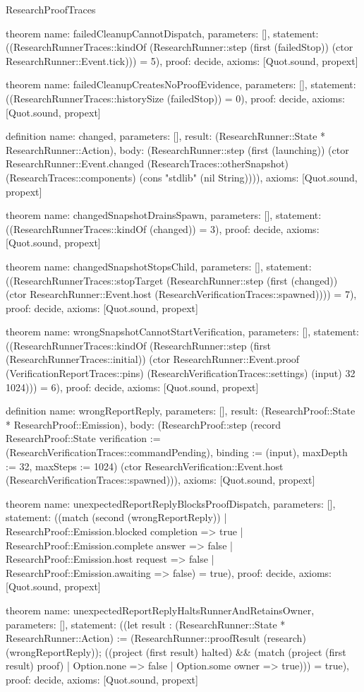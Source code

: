 \begin{lexlean}{ResearchProofTraces}
\begin{semanticmodule}
theorem{
 name: failedCleanupCannotDispatch,
 parameters: [],
 statement: ((ResearchRunnerTraces::kindOf (ResearchRunner::step (first (failedStop)) (ctor ResearchRunner::Event.tick))) = 5),
 proof: decide{},
 axioms: [Quot.sound, propext]
}

theorem{
 name: failedCleanupCreatesNoProofEvidence,
 parameters: [],
 statement: ((ResearchRunnerTraces::historySize (failedStop)) = 0),
 proof: decide{},
 axioms: [Quot.sound, propext]
}

definition{
 name: changed,
 parameters: [],
 result: (ResearchRunner::State * ResearchRunner::Action),
 body: (ResearchRunner::step (first (launching)) (ctor ResearchRunner::Event.changed (ResearchTraces::otherSnapshot) (ResearchTraces::components) (cons "stdlib" (nil String)))),
 axioms: [Quot.sound, propext]
}

theorem{
 name: changedSnapshotDrainsSpawn,
 parameters: [],
 statement: ((ResearchRunnerTraces::kindOf (changed)) = 3),
 proof: decide{},
 axioms: [Quot.sound, propext]
}

theorem{
 name: changedSnapshotStopsChild,
 parameters: [],
 statement: ((ResearchRunnerTraces::stopTarget (ResearchRunner::step (first (changed)) (ctor ResearchRunner::Event.host (ResearchVerificationTraces::spawned)))) = 7),
 proof: decide{},
 axioms: [Quot.sound, propext]
}

theorem{
 name: wrongSnapshotCannotStartVerification,
 parameters: [],
 statement: ((ResearchRunnerTraces::kindOf (ResearchRunner::step (first (ResearchRunnerTraces::initial)) (ctor ResearchRunner::Event.proof (VerificationReportTraces::pins) (ResearchVerificationTraces::settings) (input) 32 1024))) = 6),
 proof: decide{},
 axioms: [Quot.sound, propext]
}

definition{
 name: wrongReportReply,
 parameters: [],
 result: (ResearchProof::State * ResearchProof::Emission),
 body: (ResearchProof::step (record ResearchProof::State {verification := (ResearchVerificationTraces::commandPending), binding := (input), maxDepth := 32, maxSteps := 1024}) (ctor ResearchVerification::Event.host (ResearchVerificationTraces::spawned))),
 axioms: [Quot.sound, propext]
}

theorem{
 name: unexpectedReportReplyBlocksProofDispatch,
 parameters: [],
 statement: ((match (second (wrongReportReply)) | ResearchProof::Emission.blocked completion => true | ResearchProof::Emission.complete answer => false | ResearchProof::Emission.host request => false | ResearchProof::Emission.awaiting => false) = true),
 proof: decide{},
 axioms: [Quot.sound, propext]
}

theorem{
 name: unexpectedReportReplyHaltsRunnerAndRetainsOwner,
 parameters: [],
 statement: ((let result : (ResearchRunner::State * ResearchRunner::Action) := (ResearchRunner::proofResult (research) (wrongReportReply)); ((project (first result) halted) && (match (project (first result) proof) | Option.none => false | Option.some owner => true))) = true),
 proof: decide{},
 axioms: [Quot.sound, propext]
}
\end{semanticmodule}
\end{lexlean}
